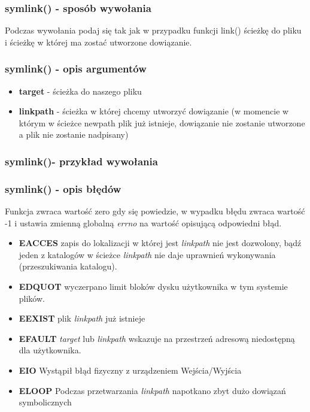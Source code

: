 \documentclass{beamer}
\begin{document}
\begin{frame}
	\frametitle{symlink() - sposób wywołania}
Podczas wywołania podaj się tak jak w przypadku funkcji link() ścieżkę do pliku i ścieżkę w której ma zostać utworzone dowiązanie.
\end{frame}

\begin{frame}
	\frametitle{symlink() - opis argumentów}
\begin{itemize}
\item \textbf{target} - ścieżka do naszego pliku
\item \textbf{linkpath} - ścieżka w której chcemy utworzyć dowiązanie (w momencie w którym w ścieżce newpath plik już istnieje, dowiązanie nie zostanie utworzone a plik nie zostanie nadpisany)
\end{itemize}
\end{frame}

\begin{frame}
\frametitle{symlink()- przykład wywołania}
\lstsymlink
\end{frame}

\begin{frame}
	\frametitle{symlink() - opis błędów}
Funkcja zwraca wartość zero gdy się powiedzie, w wypadku błędu zwraca wartość -1 i ustawia zmienną globalną \textit{errno} na wartość opisującą odpowiedni błąd.
\begin{itemize}
\item \textbf{EACCES} zapis do lokalizacji w której jest \textit{linkpath} nie jest dozwolony, bądź jeden z katalogów w ścieżce \textit{linkpath} nie daje uprawnień wykonywania (przeszukiwania katalogu).
\item \textbf{EDQUOT} wyczerpano limit bloków dysku użytkownika w tym systemie plików.
\item \textbf{EEXIST} plik \textit{linkpath} już istnieje
\item \textbf{EFAULT} \textit{target} lub  \textit{linkpath} wskazuje na przestrzeń adresową niedostępną dla użytkownika.
\item \textbf{EIO} Wystąpił błąd fizyczny z urządzeniem Wejścia/Wyjścia
\item \textbf{ELOOP} Podczas przetwarzania \textit{linkpath} napotkano zbyt dużo dowiązań symbolicznych
\end{itemize}
\end{frame}
\end{document}

